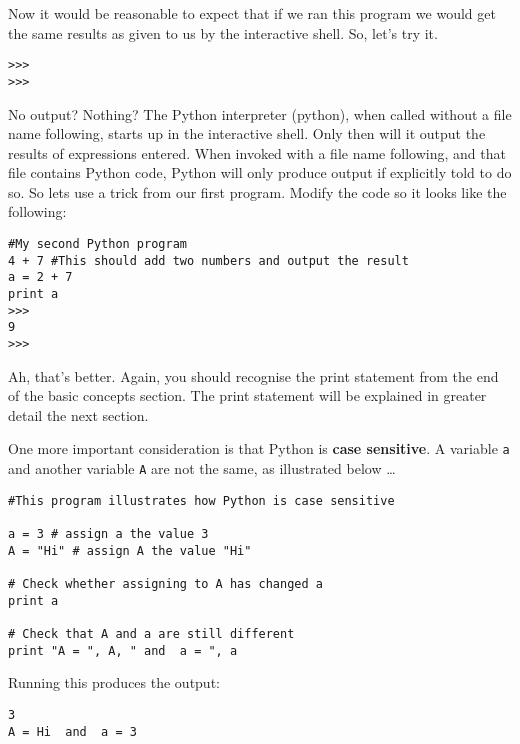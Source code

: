 Now it would be reasonable to expect that if we ran this program we   would get the same results as given to us by the interactive shell. So,   let's try it.     
\begin{lstlisting}
>>>
>>>
\end{lstlisting}

No output? Nothing? The Python interpreter (python), when called   without a file name following, starts up in the interactive shell. Only   then will it output the results of expressions entered. When invoked   with a file name following, and that file contains Python code, Python   will only produce output if explicitly told to do so. So lets use a trick    from our first program. Modify the code so it looks like the following:
\begin{lstlisting}
#My second Python program
4 + 7 #This should add two numbers and output the result
a = 2 + 7
print a
>>>
9
>>>
\end{lstlisting}

Ah, that's better. Again, you should recognise the print statement   from the end of the basic concepts section. The print statement will be   explained in greater detail the next section.

One more important consideration is that Python is \textbf{case   sensitive}. A variable \texttt{a} and another variable \texttt{A} are not the   same, as illustrated below \ldots
\begin{lstlisting}
#This program illustrates how Python is case sensitive

a = 3 # assign a the value 3
A = "Hi" # assign A the value "Hi"

# Check whether assigning to A has changed a
print a

# Check that A and a are still different
print "A = ", A, " and  a = ", a
\end{lstlisting}

Running this produces the output:
\begin{lstlisting}
3
A = Hi  and  a = 3
\end{lstlisting}

